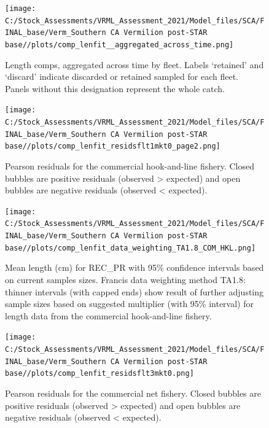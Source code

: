 \documentclass[11pt,
  english,
]{article}
\begin{document}
\FloatBarrier

\FloatBarrier

\begin{figure}
\centering
\texttt{[image: C:/Stock\_Assessments/VRML\_Assessment\_2021/Model\_files/SCA/FINAL\_base/Verm\_Southern CA Vermilion post-STAR base//plots/comp\_lenfit\_\_aggregated\_across\_time.png]}
\caption{Length comps, aggregated across time by fleet. Labels `retained' and `discard' indicate discarded or retained sampled for each fleet. Panels without this designation represent the whole catch.\label{fig:lenfits-all}}
\end{figure}

\FloatBarrier

\begin{figure}
\centering
\texttt{[image: C:/Stock\_Assessments/VRML\_Assessment\_2021/Model\_files/SCA/FINAL\_base/Verm\_Southern CA Vermilion post-STAR base//plots/comp\_lenfit\_residsflt1mkt0\_page2.png]}
\caption{Pearson residuals for the commercial hook-and-line fishery. Closed bubbles are positive residuals (observed \textgreater{} expected) and open bubbles are negative residuals (observed \textless{} expected).\label{fig:len-pearson-COM-HKL}}
\end{figure}

\begin{figure}
\centering
\texttt{[image: C:/Stock\_Assessments/VRML\_Assessment\_2021/Model\_files/SCA/FINAL\_base/Verm\_Southern CA Vermilion post-STAR base//plots/comp\_lenfit\_data\_weighting\_TA1.8\_COM\_HKL.png]}
\caption{Mean length (cm) for REC\_PR with 95\% confidence intervals based on current samples sizes. Francis data weighting method TA1.8: thinner intervals (with capped ends) show result of further adjusting sample sizes based on suggested multiplier (with 95\% interval) for length data from the commercial hook-and-line fishery.\label{fig:mean-len-fit-COM-HKL}}
\end{figure}

\begin{figure}
\centering
\texttt{[image: C:/Stock\_Assessments/VRML\_Assessment\_2021/Model\_files/SCA/FINAL\_base/Verm\_Southern CA Vermilion post-STAR base//plots/comp\_lenfit\_residsflt3mkt0.png]}
\caption{Pearson residuals for the commercial net fishery. Closed bubbles are positive residuals (observed \textgreater{} expected) and open bubbles are negative residuals (observed \textless{} expected).\label{fig:len-pearson-COM-NET}}
\end{figure}
\end{document}
